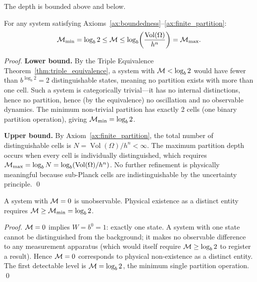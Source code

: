 The depth is bounded above and below.

\begin{theorem}
\label{thm:depth_bounds}
For any system satisfying Axioms~\ref{ax:boundedness}--\ref{ax:finite_partition}:
\begin{equation}
  \mathcal{M}_{\min} = \log_b 2 \leq \mathcal{M} \leq \log_b\!\left(\frac{\operatorname{Vol}(\Omega)}{h^n}\right) = \mathcal{M}_{\max}.
  \label{eq:depth_bounds}
\end{equation}
\end{theorem}

\begin{proof}
\textbf{Lower bound.} By the Triple Equivalence Theorem~\ref{thm:triple_equivalence},
a system with $\mathcal{M} < \log_b 2$ would have fewer than $b^{\log_b 2} = 2$
distinguishable states, meaning no partition exists with more than one cell.
Such a system is categorically trivial---it has no internal distinctions,
hence no partition, hence (by the equivalence) no oscillation and no observable
dynamics. The minimum non-trivial partition has exactly 2 cells (one binary
partition operation), giving $\mathcal{M}_{\min} = \log_b 2$.

\textbf{Upper bound.} By Axiom~\ref{ax:finite_partition}, the total number
of distinguishable cells is $N = \operatorname{Vol}(\Omega)/h^n < \infty$.
The maximum partition depth occurs when every cell is individually distinguished,
which requires $\mathcal{M}_{\max} = \log_b N = \log_b(\operatorname{Vol}(\Omega)/h^n)$.
No further refinement is physically meaningful because sub-Planck cells
are indistinguishable by the uncertainty principle. \qed
\end{proof}

\begin{corollary}
\label{cor:existence_depth}
A system with $\mathcal{M} = 0$ is unobservable. Physical existence as a distinct
entity requires $\mathcal{M} \geq \mathcal{M}_{\min} = \log_b 2$.
\end{corollary}

\begin{proof}
$\mathcal{M} = 0$ implies $W = b^0 = 1$: exactly one state. A system with one state
cannot be distinguished from the background; it makes no observable difference
to any measurement apparatus (which would itself require $\mathcal{M} \geq \log_b 2$
to register a result). Hence $\mathcal{M} = 0$ corresponds to physical
non-existence as a distinct entity. The first detectable level is $\mathcal{M} = \log_b 2$,
the minimum single partition operation. \qed
\end{proof}

